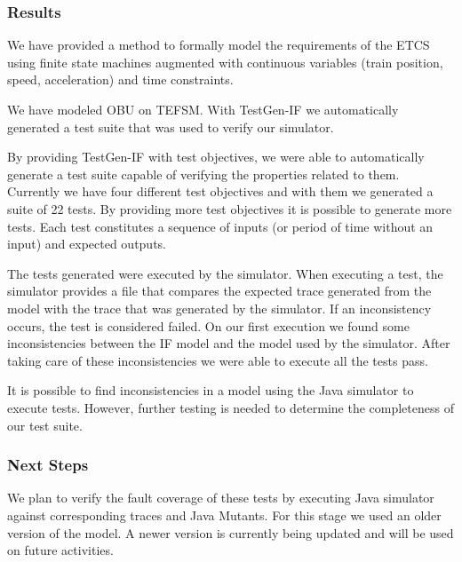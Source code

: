 \subsubsection{Results}


We have provided a method to formally model the
requirements of the ETCS using finite state machines
augmented with continuous variables (train position, speed, acceleration) and
time constraints. 

We have modeled OBU on TEFSM.
With TestGen-IF we automatically generated a test suite that was used to verify our simulator.
%


By providing TestGen-IF with test objectives, we were able to automatically generate a test suite capable of verifying the properties related to them. Currently we have four different test objectives and with them we generated a suite of 22 tests. By providing more test objectives it is possible to generate more tests.
Each test constitutes a sequence of inputs (or period of time without an input) and expected outputs.

The tests generated were executed by the simulator. When executing a test, the simulator provides a file that compares the expected trace generated from the model with the trace that was generated by the simulator. If an inconsistency occurs, the test is considered failed. On our first execution we found some inconsistencies between the IF model and the model used by the simulator. After taking care of these inconsistencies we were able to execute all the tests pass.

It is possible to find inconsistencies in a model using the Java simulator to execute tests. However, further testing is needed to determine the completeness of our test suite.

\subsubsection{Next Steps}
We plan to verify the fault coverage of these tests by executing Java
simulator against corresponding traces and Java Mutants. For this stage we used an older version of the model. A newer version is currently being updated and will be used on future activities.